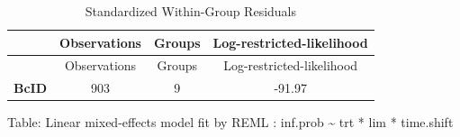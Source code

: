\documentclass[]{article}
\begin{document}
\begin{longtable}[]{@{}cccc@{}}
\caption{Standardized Within-Group Residuals}\tabularnewline
\toprule
\begin{minipage}[b]{0.14\columnwidth}\centering\strut
~\strut
\end{minipage} & \begin{minipage}[b]{0.18\columnwidth}\centering\strut
Observations\strut
\end{minipage} & \begin{minipage}[b]{0.11\columnwidth}\centering\strut
Groups\strut
\end{minipage} & \begin{minipage}[b]{0.33\columnwidth}\centering\strut
Log-restricted-likelihood\strut
\end{minipage}\tabularnewline
\midrule
\endfirsthead
\toprule
\begin{minipage}[b]{0.14\columnwidth}\centering\strut
~\strut
\end{minipage} & \begin{minipage}[b]{0.18\columnwidth}\centering\strut
Observations\strut
\end{minipage} & \begin{minipage}[b]{0.11\columnwidth}\centering\strut
Groups\strut
\end{minipage} & \begin{minipage}[b]{0.33\columnwidth}\centering\strut
Log-restricted-likelihood\strut
\end{minipage}\tabularnewline
\midrule
\endhead
\begin{minipage}[t]{0.14\columnwidth}\centering\strut
\textbf{BcID}\strut
\end{minipage} & \begin{minipage}[t]{0.18\columnwidth}\centering\strut
903\strut
\end{minipage} & \begin{minipage}[t]{0.11\columnwidth}\centering\strut
9\strut
\end{minipage} & \begin{minipage}[t]{0.33\columnwidth}\centering\strut
-91.97\strut
\end{minipage}\tabularnewline
\bottomrule
\end{longtable}

Table: Linear mixed-effects model fit by REML : inf.prob
\textasciitilde{} trt * lim * time.shift

\newpage
\end{document}
